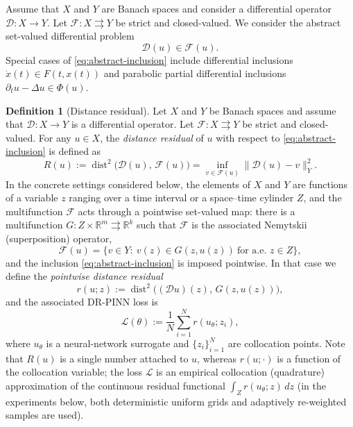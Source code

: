 \documentclass[11pt]{elsarticle}
\theoremstyle{definition}
\newtheorem{definition}[theorem]{Definition}
\theoremstyle{remark}
\numberwithin{equation}{section}
\def\dist{\operatorname{dist}}
\begin{document}
	Assume that $X$ and $Y$ are Banach spaces and consider a differential operator $\mathcal{D}:X\to Y$. Let $\mathcal{F}:X\rightrightarrows Y$ be strict and closed-valued. We consider the abstract
	set-valued differential problem
	\begin{equation}\label{eq:abstract-inclusion}
		\mathcal{D}(u)\in\mathcal{F}(u).
	\end{equation}
	Special cases of \eqref{eq:abstract-inclusion} include differential
	inclusions $\dot{x}(t)\in F(t,x(t))$ and parabolic partial differential
	inclusions $\partial_t u-\Delta u\in\Phi(u)$.
	
	\begin{definition}[Distance residual]
		Let $X$ and $Y$ be Banach spaces and assume that $\mathcal{D}:X\to Y$ is a differential operator. Let $\mathcal{F}:X\rightrightarrows Y$ be strict and
		closed-valued.
		For any $u\in X$, the \emph{distance residual} of $u$ with respect to
		\eqref{eq:abstract-inclusion} is defined as
		\[
		R(u):=\dist^2\bigl(\mathcal{D}(u),\,\mathcal{F}(u)\bigr)
		= \inf_{v\in \mathcal{F}(u)} \|\mathcal{D}(u) - v \|_Y^2.
		\]
		In the concrete settings considered below, the elements of $X$ and
		$Y$ are functions of a variable $z$ ranging over a time interval or a
		space--time cylinder $Z$, and the multifunction $\mathcal{F}$ acts
		through a pointwise set-valued map: there is a multifunction
		$G:Z\times\mathbb{R}^m\rightrightarrows\mathbb{R}^k$ such that
		$\mathcal{F}$ is the associated Nemytskii (superposition) operator,
		\[
		\mathcal{F}(u)
		=
		\bigl\{v\in Y:\ v(z)\in G(z,u(z))\ \text{for a.e. } z\in Z\bigr\},
		\]
		and the inclusion \eqref{eq:abstract-inclusion} is imposed pointwise.
		In that case we define the \emph{pointwise distance residual}
		\[
		r(u;z)
		:=
		\dist^2\bigl((\mathcal{D}u)(z),\,G(z,u(z))\bigr),
		\]
		and the associated DR-PINN loss is
		\[
		\mathcal{L}(\theta)
		:=
		\frac{1}{N}\sum_{i=1}^{N} r(u_\theta;z_i),
		\]
		where $u_\theta$ is a neural-network surrogate and $\{z_i\}_{i=1}^N$ are
		collocation points. Note that $R(u)$ is a single number attached to $u$,
		whereas $r(u;\cdot)$ is a function of the collocation variable; the loss
		$\mathcal{L}$ is an empirical collocation (quadrature) approximation of
		the continuous residual functional $\int_Z r(u_\theta;z)\,dz$
		(in the experiments below, both deterministic uniform grids and
		adaptively re-weighted samples are used).
	\end{definition}
\end{document}
